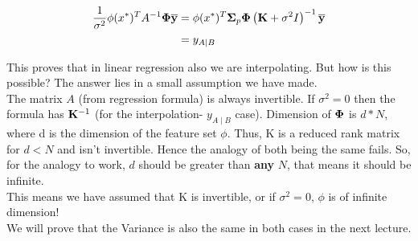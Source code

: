 \documentclass[12pt]{article}
\begin{document}
\[
\begin{split}
 \frac{1}{\sigma^2}\phi(x^*)^T A^{-1} \bold{\Phi} \bold{\overline y} &=\phi(x^*)^T  \bold{\Sigma}_p \bold{\Phi} \left(  \textbf{K} + \sigma^2 I \right)^{-1} \bold{\overline y}\\
  &= y_{A\mid B}\\
\end{split}
\] 


\noindent This proves that in linear regression also we are interpolating. But how is this possible? The answer lies in a small assumption we have made.\\

\noindent The matrix $A$ (from regression formula) is always invertible. If $\sigma^2 = 0$ then the formula has $\bold{K}^{-1}$ (for the interpolation- $y_{A\mid B}$ case). Dimension of $\bold{\Phi}$ is $d*N$, where d is the dimension of the feature set $\phi$. Thus, K is a reduced rank matrix for $d<N$ and isn't invertible. Hence the analogy of both being the same fails. So, for the analogy to work, $d$ should be greater than \textbf{any} $N$, that means it should be infinite.\\

\noindent This means we have assumed that K is invertible, or if $\sigma^2 = 0$, $\phi$ is of infinite dimension!\\

\noindent We will prove that the Variance is also the same in both cases in the next lecture.











\end{document}
